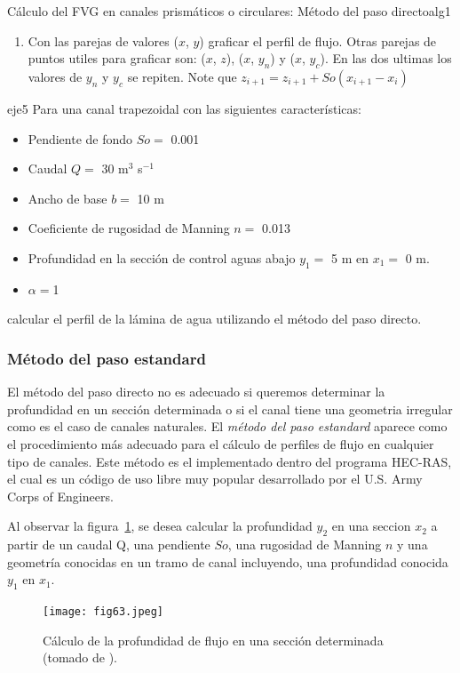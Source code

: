 \documentclass[11pt, oneside]{article}
\begin{document}
\begin{alg}{C\'alculo del FVG en canales prism\'aticos o circulares: M\'etodo del paso directo}{alg1}
\begin{enumerate}
\item Con las parejas de valores ($x$, $y$) graficar el perfil de flujo. Otras parejas de puntos utiles para graficar son: ($x$, $z$), ($x$, $y_n$) y ($x$, $y_c$). En las dos ultimas los valores de $y_n$ y $y_c$ se repiten. Note que $z_{i+1} = z_{i+1} + So \left( x_{i+1} - x_i \right)$

\end{enumerate}
\end{alg}

\begin{eje}{}{eje5}
 Para una canal trapezoidal con las siguientes caracter\'isticas:
 \begin{itemize}
     \item Pendiente de fondo $So =$ 0.001
     \item Caudal $Q = $ 30 m$^3$ s$^{-1}$
     \item Ancho de base $b =$ 10 m
     \item Coeficiente de rugosidad de Manning $n = $ 0.013
     \item Profundidad en la secci\'on de control aguas abajo $y_1 = $ 5 m en $x_1 =$ 0 m.
     \item $\alpha = $1
 \end{itemize}
 calcular el perfil de la l\'amina de agua utilizando el m\'etodo del paso directo. 
\end{eje}




\subsubsection{M\'etodo del paso estandard}
El m\'etodo del paso directo no es adecuado si queremos determinar la profundidad en un secci\'on determinada o si el canal tiene una geometria irregular como es el caso de canales naturales. El \emph{m\'etodo del paso estandard} aparece como el procedimiento m\'as adecuado para el c\'alculo de perfiles de flujo en cualquier tipo de canales. Este m\'etodo es el implementado dentro del programa  HEC-RAS, el cual es un c\'odigo de uso libre muy popular desarrollado por el U.S. Army Corps of Engineers. 

Al observar la figura~\ref{fig9}, se desea calcular la profundidad $y_2$ en una seccion $x_2$ a partir de un caudal Q, una pendiente $So$, una rugosidad de Manning $n$ y una geometr\'ia conocidas en un tramo de canal incluyendo, una profundidad conocida  $y_1$ en $x_1$.

\begin{figure}[h]
\centering
\texttt{[image: fig63.jpeg]}
\caption{C\'alculo de la profundidad de flujo en una secci\'on determinada (tomado de \cite{Chau}).}
\label{fig9}
\end{figure}
\end{document}
